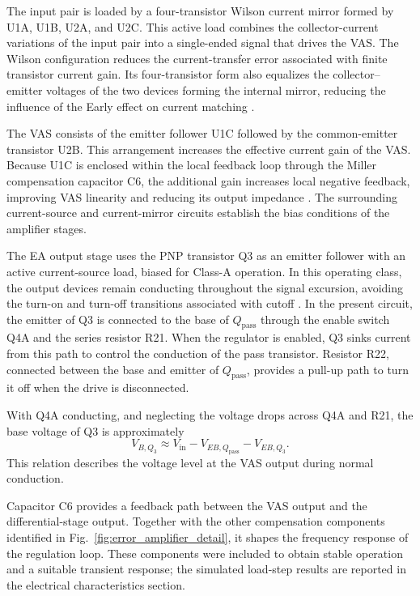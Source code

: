 \documentclass[conference]{IEEEtran}
\begin{document}
The input pair is loaded by a four-transistor Wilson
current mirror formed by U1A, U1B, U2A, and U2C.
This active load combines the collector-current variations
of the input pair into a single-ended signal that drives
the VAS. The Wilson configuration reduces the
current-transfer error associated with finite transistor
current gain. Its four-transistor form also equalizes
the collector--emitter voltages of the two devices
forming the internal mirror, reducing the influence of
the Early effect on current matching
\cite{self_audio_power_2009}.

The VAS consists of the emitter follower U1C followed
by the common-emitter transistor U2B. This arrangement
increases the effective current gain of the VAS.
Because U1C is enclosed within the local feedback loop
through the Miller compensation capacitor C6, the
additional gain increases local negative feedback,
improving VAS linearity and reducing its output
impedance \cite{self_audio_power_2009}. The surrounding
current-source and current-mirror circuits establish
the bias conditions of the amplifier stages.

The EA output stage uses the PNP transistor Q3 as an
emitter follower with an active current-source load,
biased for Class-A operation. In this operating class,
the output devices remain conducting throughout the
signal excursion, avoiding the turn-on and turn-off
transitions associated with cutoff
\cite{self_audio_power_2009}. In the present circuit,
the emitter of Q3 is connected to the base of
\(Q_{\mathrm{pass}}\) through the enable switch Q4A
and the series resistor R21. When the regulator is
enabled, Q3 sinks current from this path to control
the conduction of the pass transistor. Resistor R22,
connected between the base and emitter of
\(Q_{\mathrm{pass}}\), provides a pull-up path to
turn it off when the drive is disconnected.

With Q4A conducting, and neglecting the voltage drops
across Q4A and R21, the base voltage of Q3 is approximately
\[
V_{B,Q_3}
\approx
V_{\mathrm{in}}
-
V_{EB,Q_{\mathrm{pass}}}
-
V_{EB,Q_3}.
\]
This relation describes the voltage level at the VAS
output during normal conduction.

Capacitor C6 provides a feedback path between the VAS
output and the differential-stage output. Together with
the other compensation components identified in
Fig.~\ref{fig:error_amplifier_detail}, it shapes the
frequency response of the regulation loop. These
components were included to obtain stable operation
and a suitable transient response; the simulated
load-step results are reported in the electrical
characteristics section.
\end{document}

